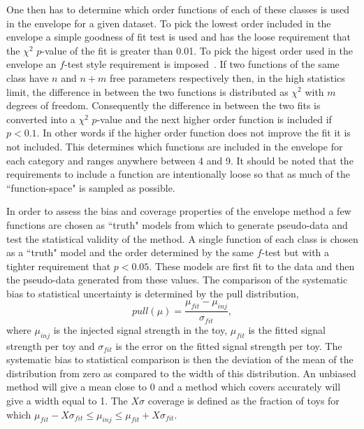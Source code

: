 One then has to determine which order functions of each of these classes is used in the envelope for a given dataset. To pick the lowest order included in the envelope a simple goodness of fit test is used and has the loose requirement that the $\chi^{2}$ $p$-value of the fit is greater than 0.01. To pick the higest order used in the envelope an $f$-test style requirement is imposed~\cite{ftest}. If two functions of the same class have $n$ and $n+m$ free parameters respectively then, in the high statistics limit, the difference in \NLL between the two functions is distributed as $\chi^{2}$ with $m$ degrees of freedom. Consequently the difference in \NLL between the two fits is converted into a $\chi^{2}$ $p$-value and the next higher order function is included if $p<0.1$. In other words if the higher order function does not improve the fit it is not included. This determines which functions are included in the envelope for each category and ranges anywhere between 4 and 9. It should be noted that the requirements to include a function are intentionally loose so that as much of the ``function-space" is sampled as possible.

In order to assess the bias and coverage properties of the envelope method a few functions are chosen as ``truth" models from which to generate pseudo-data and test the statistical validity of the method. A single function of each class is chosen as a ``truth" model and the order determined by the same $f$-test but with a tighter requirement that $p<0.05$. These models are first fit to the data and then the pseudo-data generated from these values. The comparison of the systematic bias to statistical uncertainty is determined by the pull distribution,
\begin{equation}
  pull(\mu) = \frac{\mu_{fit} - \mu_{inj}}{\sigma_{fit}},
\end{equation}
where $\mu_{inj}$ is the injected signal strength in the toy, $\mu_{fit}$ is the fitted signal strength per toy and $\sigma_{fit}$ is the error on the fitted signal strength per toy. The systematic bias to statistical comparison is then the deviation of the mean of the distribution from zero as compared to the width of this distribution. An unbiased method will give a mean close to 0 and a method which covers accurately will give a width equal to 1. The $X\sigma$ coverage is defined as the fraction of toys for which $\mu_{fit}-X\sigma_{fit}\leq\mu_{inj}\leq\mu_{fit}+X\sigma_{fit}$.

